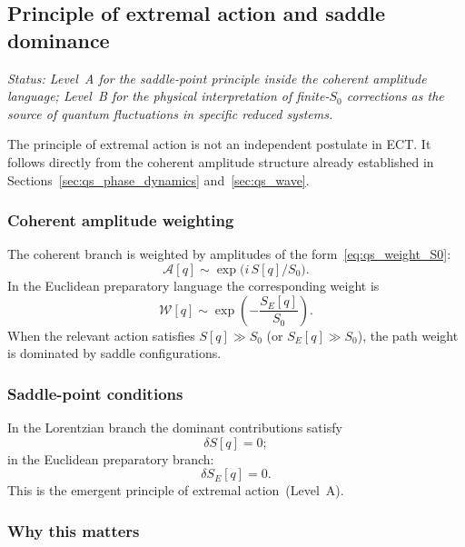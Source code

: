 \documentclass[11pt,a4paper]{article}
\numberwithin{equation}{section}
\begin{document}
\subsection{Principle of extremal action and saddle dominance}
\label{sec:qs_extremal_action}

\textit{Status: Level~A for the saddle-point principle inside the
coherent amplitude language; Level~B for the physical interpretation
of finite-$S_0$ corrections as the source of quantum fluctuations in
specific reduced systems.}

\medskip
The principle of extremal action is not an independent postulate in
ECT.
It follows directly from the coherent amplitude structure already
established in Sections~\ref{sec:qs_phase_dynamics}
and~\ref{sec:qs_wave}.

\subsubsection*{Coherent amplitude weighting}

The coherent branch is weighted by amplitudes of the
form~\eqref{eq:qs_weight_S0}:
\[
  \mathcal{A}[q] \sim \exp\!\bigl(i\,S[q]/S_0\bigr).
\]
In the Euclidean preparatory language the corresponding weight is
\begin{equation}
  \label{eq:qs_extremal_weight_E}
  \mathcal{W}[q]
  \sim
  \exp\!\left(-\frac{S_E[q]}{S_0}\right).
\end{equation}
When the relevant action satisfies $S[q]\gg S_0$ (or $S_E[q]\gg S_0$),
the path weight is dominated by saddle configurations.

\subsubsection*{Saddle-point conditions}

In the Lorentzian branch the dominant contributions satisfy
\begin{equation}
  \label{eq:qs_saddle}
  \delta S[q] = 0;
\end{equation}
in the Euclidean preparatory branch:
\begin{equation}
  \label{eq:qs_saddle_E}
  \delta S_E[q] = 0.
\end{equation}
This is the emergent principle of extremal action~(Level~A).

\subsubsection*{Why this matters}
\end{document}
